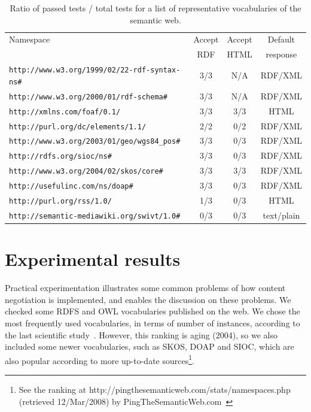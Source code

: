 \documentclass{../templates/llncs}
\begin{document}
\begin{table}
\caption{Ratio of passed tests / total tests for a list of representative vocabularies of the semantic web.}
\centering
\begin{tabular}{lccc}
\hline
Namespace & Accept & Accept & Default \\
 & RDF & HTML & response \\
\hline\hline
\texttt{http://www.w3.org/1999/02/22-rdf-syntax-ns\#} & 3/3 & N/A & RDF/XML \\
\texttt{http://www.w3.org/2000/01/rdf-schema\#} & 3/3 & N/A & RDF/XML \\
\texttt{http://xmlns.com/foaf/0.1/} & 3/3 & 3/3 & HTML \\
\texttt{http://purl.org/dc/elements/1.1/} & 2/2 & 0/2 & RDF/XML \\
\texttt{http://www.w3.org/2003/01/geo/wgs84\_pos\#} & 3/3 & 0/3 & RDF/XML \\
\texttt{http://rdfs.org/sioc/ns\#} & 3/3 & 0/3 & RDF/XML \\
\texttt{http://www.w3.org/2004/02/skos/core\#} & 3/3 & 3/3 & RDF/XML \\
\texttt{http://usefulinc.com/ns/doap\#} & 3/3 & 0/3 & RDF/XML \\
\texttt{http://purl.org/rss/1.0/} & 1/3 & 0/3 & HTML \\
\texttt{http://semantic-mediawiki.org/swivt/1.0\#} & 0/3 & 0/3 & text/plain \\ [1ex]
\hline
\end{tabular}
\label{tab:usage}
\end{table}

\section{\label{sec:experimental}Experimental results}

Practical experimentation illustrates some common problems of how
content negotiation is implemented, and enables the discussion on 
these problems. We checked some RDFS and OWL vocabularies published on the web.
We chose the most frequently used vocabularies, in terms of number of
instances, according to the last scientific study~\cite{Li2005}. However,
this ranking is aging (2004), so we also included some newer
vocabularies, such as SKOS, DOAP and SIOC, which are also popular
according to more up-to-date sources\footnote{See the ranking at http://pingthesemanticweb.com/stats/namespaces.php (retrieved 12/Mar/2008) by PingTheSemanticWeb.com~\cite{Bojars2007}}.
\end{document}
